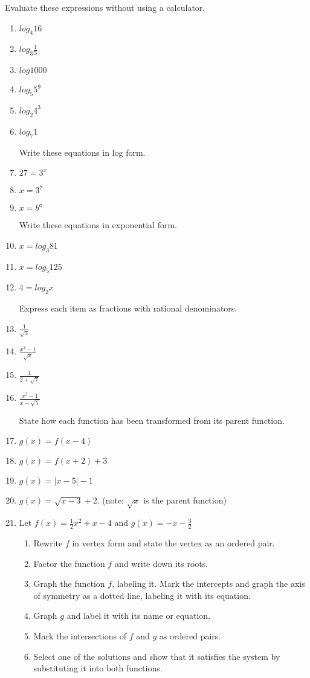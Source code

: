 \documentclass[]{book}
\begin{document}
Evaluate these expressions without using a calculator.
\begin{enumerate}
\item $log_4 16$
\item $log_3 \frac{1}{3}$
\item $log 1000$
\item $log_5 5^9$
\item $log_2 4^3$
\item $log_7 1$

Write these equations in log form.
\item $27=3^x$
\item $x=3^7$
\item $x=b^a$

Write these equations in exponential form.
\item $x=log_3 81$
\item $x = log_5 125$
\item $4 = log_2 x$

Express each item as fractions with rational denominators.
\item $\displaystyle   \frac{1}{\sqrt{3}}$
\item $\displaystyle  \frac{x^2-1}{\sqrt{x}}$
\item $\displaystyle  \frac{1}{2+\sqrt{7}}$
\item $\displaystyle  \frac{x^2-1}{x-\sqrt{5}}$

State how each function has been transformed from its parent function.
\item $g(x)=f(x-4)$
\item $g(x)= f(x+2) + 3$
\item $g(x) = |x-5|-1$
\item $g(x) = \sqrt{x-3}+2$. (note: $\sqrt{x}$ is the parent function)

\newpage 
\item Let $f(x) = \frac{1}{2}x^2+x-4$ and $g(x)=-x-\frac{3}{2}$
\begin{enumerate}
    \item Rewrite $f$ in vertex form and state the vertex as an ordered pair.
    \item Factor the function $f$ and write down its roots.
    \item Graph the function $f$, labeling it. Mark the intercepts and graph the axis of symmetry as a dotted line, labeling it with its equation.
    \item Graph $g$ and label it with its name or equation.
    \item Mark the intersections of $f$ and $g$ as ordered pairs. 
    \item Select one of the solutions and show that it satisfies the system by substituting it into both functions.
\end{enumerate}



\end{enumerate}
\end{document}

